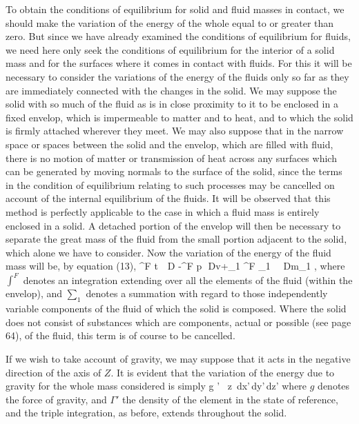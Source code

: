 \documentclass[12pt]{article}
\begin{document}
To obtain the conditions of equilibrium for solid and fluid masses in contact, we should make the variation of the energy of the whole equal to or greater than zero. But since we have already examined the conditions of equilibrium for fluids, we need here only seek the conditions of equilibrium for the interior of a solid mass and for the surfaces where it comes in contact with fluids. For this it will be necessary to consider the variations of the energy of the fluids only so far as they are immediately connected with the changes in the solid. We may suppose the solid with so much of the fluid as is in close proximity to it to be enclosed in a fixed envelop, which is impermeable to matter and to heat, and to which the solid is firmly attached wherever they meet. We may also suppose that in the narrow space or spaces between the solid and the envelop, which are filled with fluid, there is no motion of matter or transmission of heat across any surfaces which can be generated by moving normals to the surface of the solid, since the terms in the condition of equilibrium relating to such processes may be cancelled on account of the internal equilibrium of the fluids. It will be observed that this method is perfectly applicable to the case in which a fluid mass is entirely enclosed in a solid. A detached portion of the envelop will then be necessary to separate the great mass of the fluid from the small portion adjacent to the solid, which alone we have to consider. Now the variation of the energy of the fluid mass will be, by equation (13),
\eqs \int^F t \, \delta \,D \eta -\int^F p \,\delta \,Dv+\sum_1 \int^F \mu_1 \, \delta \, Dm_1 , \label{358}\eqe
where $\int^F$ denotes an integration extending over all the elements of the fluid (within the envelop), and $\sum_1$ denotes a summation with regard to those independently variable components of the fluid of which the solid is composed. Where the solid does not consist of substances which are components, actual or possible (see page 64), of the fluid, this term is of course to be cancelled.


If we wish to take account of gravity, we may suppose that it acts in the negative direction of the axis of $Z$. It is evident that the variation of the energy due to gravity for the whole mass considered is simply
\eqs \int \int \int g \Gamma' \, \delta z \,dx'\,dy'\,dz' \label{359}\eqe
where $g$ denotes the force of gravity, and $\Gamma'$ the density of the element in the state of reference, and the triple integration, as before, extends throughout the solid.
\end{document}
